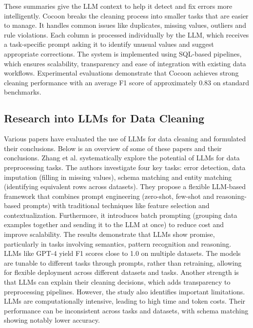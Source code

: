 These summaries give the LLM context to help it detect and fix errors more intelligently. 
Cocoon breaks the cleaning process into smaller tasks that are easier to manage. 
It handles common issues like duplicates, missing values, outliers and rule violations. 
Each column is processed individually by the LLM, which receives a task-specific prompt asking it to identify unusual values and suggest appropriate corrections. 
The system is implemented using SQL-based pipelines, which ensures scalability, transparency and ease of integration with existing data workflows. 
Experimental evaluations demonstrate that Cocoon achieves strong cleaning performance with an average F1 score of approximately 0.83 on standard benchmarks.

\subsection{Research into LLMs for Data Cleaning}
Various papers have evaluated the use of LLMs for data cleaning and formulated their conclusions. 
Below is an overview of some of these papers and their conclusions.
\newline\newline
Zhang et al. \cite{LLMDATAPREP} systematically explore the potential of LLMs for data preprocessing tasks. 
The authors investigate four key tasks: error detection, data imputation (filling in missing values), schema matching and entity matching (identifying equivalent rows across datasets). 
They propose a flexible LLM-based framework that combines prompt engineering (zero-shot, few-shot and reasoning-based prompts) with traditional techniques like feature selection and contextualization. 
Furthermore, it introduces batch prompting (grouping data examples together and sending it to the LLM at once) to reduce cost and improve scalability. 
The results demonstrate that LLMs show promise, particularly in tasks involving semantics, pattern recognition and reasoning. 
LLMs like GPT-4 yield F1 scores close to 1.0 on multiple datasets. 
The models are tunable to different tasks through prompts, rather than retraining, allowing for flexible deployment across different datasets and tasks. 
Another strength is that LLMs can explain their cleaning decisions, which adds transparency to preprocessing pipelines. 
However, the study also identifies important limitations. LLMs are computationally intensive, leading to high time and token costs. 
Their performance can be inconsistent across tasks and datasets, with schema matching showing notably lower accuracy. 
